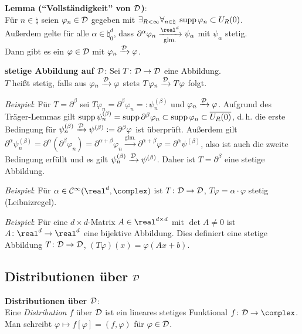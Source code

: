 \textbf{Lemma ("`Vollständigkeit"' von $\mathcal{D}$)}:\\
Für $n \in \natural$ seien $\varphi_n \in \mathcal{D}$ gegeben mit
$\exists_{R < \infty} \forall_{n \in \natural}\;
\operatorname{supp} \varphi_n \subset U_R(0)$.\\
Außerdem gelte für alle $\alpha \in \natural_0^d$, dass
$\partial^\alpha \varphi_n
\xrightarrow[\text{glm.}]{\real^d} \psi_\alpha$ mit
$\psi_\alpha$ stetig.\\
Dann gibt es ein $\varphi \in \mathcal{D}$ mit $\varphi_n \xrightarrow{\mathcal{D}} \varphi$.

\linie

\textbf{stetige Abbildung auf $\mathcal{D}$}:
Sei $T\colon \mathcal{D} \rightarrow \mathcal{D}$ eine Abbildung.\\
$T$ heißt stetig, falls aus $\varphi_n \xrightarrow{\mathcal{D}} \varphi$ stets
$T \varphi_n \xrightarrow{\mathcal{D}} T\varphi$ folgt.

\emph{Beispiel}:
Für $T = \partial^\beta$ sei
$T \varphi_n = \partial^\beta \varphi_n =: \psi_n^{(\beta)}$ und
$\varphi_n \xrightarrow{\mathcal{D}} \varphi$.
Aufgrund des Träger-Lemmas gilt
$\operatorname{supp} \psi_n^{(\beta)} = \operatorname{supp} \partial^\beta \varphi_n \subset
\operatorname{supp} \varphi_n \subset \overline{U_R(0)}$,
d.\,h. die erste Bedingung für
$\psi_n^{(\beta)} \xrightarrow{\mathcal{D}} \psi^{(\beta)} := \partial^\beta \varphi$
ist überprüft.
Außerdem gilt $\partial^\alpha \psi_n^{(\beta)} =
\partial^\alpha (\partial^\beta \varphi_n) =
\partial^{\alpha + \beta} \varphi_n \xrightarrow{\text{glm.}}
\partial^{\alpha + \beta} \varphi = \partial^\alpha \psi^{(\beta)}$,
also ist auch die zweite Bedingung erfüllt und es gilt
$\psi_n^{(\beta)} \xrightarrow{\mathcal{D}} \psi^{(\beta)}$.
Daher ist $T = \partial^\beta$ eine stetige Abbildung.

\emph{Beispiel}:
Für $\alpha \in \C^\infty(\real^d, \complex)$ ist
$T\colon \mathcal{D} \rightarrow \mathcal{D}$, $T\varphi = \alpha \cdot \varphi$ stetig
(Leibnizregel).

\emph{Beispiel}:
Für eine $d \times d$-Matrix $A \in \real^{d \times d}$ mit $\det A \not= 0$
ist $A\colon \real^d \rightarrow \real^d$ eine bijektive Abbildung.
Dies definiert eine stetige Abbildung $T\colon \mathcal{D} \rightarrow \mathcal{D}$,
$(T\varphi)(x) = \varphi(Ax + b)$.

\pagebreak

\subsection{%
    Distributionen über \texorpdfstring{$\mathcal{D}$}{D}%
}

\textbf{Distributionen über $\mathcal{D}$}:\\
Eine \emph{Distribution} $f$ über $\mathcal{D}$ ist ein lineares stetiges Funktional
$f\colon \D \rightarrow \complex$.\\
Man schreibt $\varphi \mapsto f[\varphi] = (f, \varphi)$ für $\varphi \in \mathcal{D}$.

